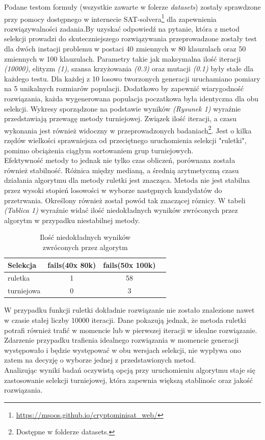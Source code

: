 \documentclass[twoside,twocolumn]{article}
\begin{document}
\indent Podane testom formuły (wszystkie zawarte w folerze \textit{datasets}) zostały sprawdzone przy pomocy dostępnego w internecie SAT-solvera\footnote{\url{https://msoos.github.io/cryptominisat_web/}} dla zapewnienia rozwiązywalności zadania.\newpage By uzyskać odpowiedź na pytanie, która z metod selekcji prowadzi do skuteczniejszego rozwiązywania przeprowadzone zostały test dla dwóch instacji problemu w postaci 40 zmiennych w 80 klauzulach oraz 50 zmiennych w 100 klauzulach. Parametry takie jak maksymalna ilość iteracji \textit{(10000)}, elityzm \textit{(1)}, szansa krzyżowania \textit{(0.3)} oraz mutacji \textit{(0.1)} były stałe dla każdego testu. Dla każdej z 10 losowo tworzonych generacji uruchamiano pomiary na 5 unikalnych rozmiarów populacji. Dodatkowo by zapewnić wiarygodność rozwiązania, każda wygenerowana populacja poczatkowa była identyczna dla obu selekcji. Wykresy sporządzone na podstawie wyników \textit{(Rysunek 1)} wyraźnie przedstawiają przewagę metody turniejowej. Związek ilość iteracji, a czasu wykonania jest również widoczny w przeprowadzonych badaniach\footnote{Dostępne w folderze datasets.}. Jest o kilka rzędów wielkości sprawniejsza od przeciętnego uruchomienia selekcji "ruletki", pomimo obciążenia ciągłym sortowaniem grup turniejowych.\\ \indent
Efektywność metody to jednak nie tylko czas obliczeń, porównana została również stabilność. Różnica między medianą, a średnią arytmetyczną czasu działania algorytmu dla metody ruletki jest znacząca. Metoda nie jest stabilna przez wysoki stopień losowości w wyborze następnych kandydatów do przetrwania. Określony również został powód tak znaczącej róznicy. W tabeli \textit{(Tablica 1)} wyraźnie widać ilość niedokładnych wyników zwróconych przez algorytm w przypadku niestabilnej metody.
\begin{table}
\caption{Ilość niedokładnych wyników \\zwróconych przez algorytm}
\begin{tabular}{l*{2}{c}r}
Selekcja & fails(40x 80k) & fails(50x 100k) \\
\hline
ruletka & 1 & 58 \\
turniejowa & 0 & 3 \\
\end{tabular}
\end{table}
W przypadku funkcji ruletki dokładnie rozwiązanie nie zostało znalezione nawet w czasie stałej liczby 10000 iteracji. Dane pokazują jednak, że metoda ruletki potrafi również trafić w momencie lub w pierwszej iteracji w idealne rozwiązanie. Zdarzenie przypadku trafienia idealnego rozwiązania w momencie generacji występowało i będzie występować w obu wersjach selekcji, nie wypływa ono zatem na decyzję o wyborze jednej z przedstawionych metod.
\\ \indent Analizując wyniki badań oczywistą opcją przy uruchomieniu algorytmu staje się zastosowanie selekcji turniejowej, która zapewnia większą stablinośc oraz jakość rozwiązania.
\end{document}
